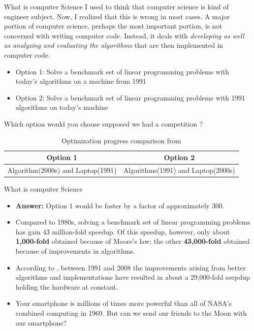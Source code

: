 \documentclass[handout]{beamer} %
\begin{document}
\begin{frame}{What is computer Science}
	I used to think that computer science is kind of engineer subject. Now, I realized that this is wrong in most cases. A major portion of computer science, perhaps the most important portion, is not concerned with writing computer code. Instead, it deals with \textit{developing as well as analyzing and evaluating the algorithms} that are then implemented in computer code.
\begin{itemize}
\setlength\itemsep{1em}
	\item Option 1: Solve a benchmark set of linear programming problems with today’s algorithms on a machine from 1991
	\item Option 2: Solve a benchmark set of linear programming problems with 1991 algorithms on today’s machine
\end{itemize}

Which option would you choose supposed we had a competition ?
\begin{table}[H]
	\centering
	\begin{tabular}{c|c}
	\hline
	\hline
		Option 1 & Option 2 \\
		\hline
		Algorithm(2000s) and Laptop(1991) & Algorithms(1991) and Laptop(2000s) \\
		\hline
	\end{tabular}
	\caption{Optimization progress comparison from \cite{bixby2012brief}  }
\end{table}
\end{frame}


\begin{frame}{What is computer Science}
\begin{itemize}
\setlength\itemsep{1em}
	\item \textbf{Answer:} Option 1 would be faster by a factor of approximately 300.
	\item Compared to 1980s, solving a benchmark set of linear programming problems has gain 43 million-fold speedup. Of this speedup, however, only about \textbf{1,000-fold} obtained because of Moore's law; the other \textbf{43,000-fold} obtained because of improvements in algorithms.
	\item According to \cite{bixby2012brief}, between 1991 and 2008 the improvements arising from better algorithms and implementations have resulted in about a 29,000-fold seepdup holding the hardware at constant.
	\item Your smartphone is millions of times more powerful than all of NASA’s combined computing in 1969. But can we send our friends to the Moon with our smartphone?
\end{itemize}

\end{frame}
\end{document}
